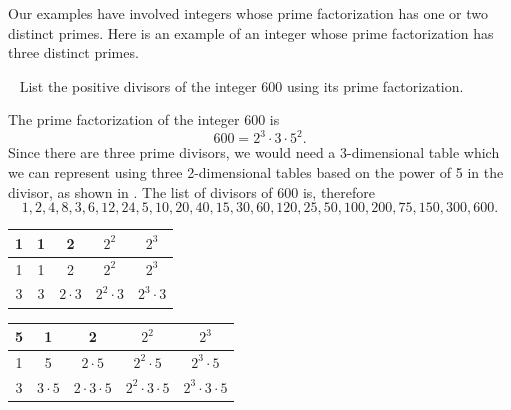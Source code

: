 Our examples have involved integers whose prime factorization has one or two distinct primes. Here is an example of an integer whose prime factorization has three distinct primes.

\begin{exam}
\label{exam_list_divisors_from_prime_fact_600}
~
    List the positive divisors of the integer 600 using its prime factorization. 
        \begin{soln}
            The prime factorization of the integer 600 is 
                $$600=2^3 \cdot 3 \cdot 5^2.$$  
            Since there are three prime divisors, we would need a 3-dimensional table which we can represent using three 2-dimensional tables based on the power of 5 in the divisor, as shown in . The list of divisors of 600 is, therefore
                $$1, 2, 4, 8, 3, 6, 12, 24,
                5, 10, 20, 40, 15, 30, 60, 120,
                25, 50, 100, 200, 75, 150, 300, 600.$$

                \begin{table}[hbtp]
                \centering
                    \begin{tabular}{c|| c|c|c|c}
                        1 & 1 & 2 & $2^2$ & $2^3$  \\ \hline \hline
                        1 & 1 & 2 & $2^2$ & $2^3$  \\ \hline
                        3 & 3 & $2 \cdot 3$ & $2^2\cdot 3$ & $2^3\cdot 3$  \\ 
                    \end{tabular}
                    
                \vspace{.25in} %
                
                    \begin{tabular}{c|| c|c|c|c}
                        5 & 1 & 2 & $2^2$ & $2^3$  \\ \hline \hline
                        1 & 5 & $2\cdot 5$ & $2^2\cdot 5$ & $2^3\cdot 5$  \\ \hline
                        3 & $3 \cdot 5$ & $2 \cdot 3 \cdot 5$ & $2^2\cdot 3 \cdot 5$ & $2^3\cdot 3 \cdot 5$  \\ 
                    \end{tabular} 
                    

\end{table}
\end{soln}
\end{exam}
